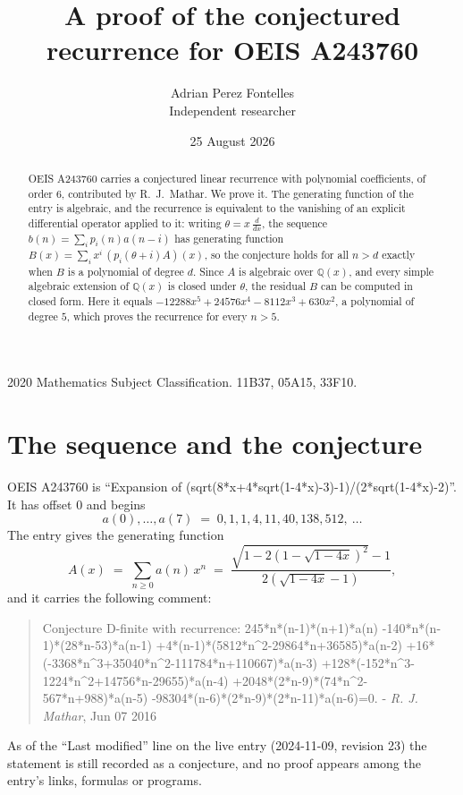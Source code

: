 \documentclass[11pt,a4paper]{article}
\title{A proof of the conjectured recurrence for OEIS A243760}
\author{Adrian Perez Fontelles\\ \small Independent researcher}
\date{25 August 2026}
\theoremstyle{plain}
\theoremstyle{definition}
\begin{document}
\maketitle

\begin{abstract}
OEIS A243760 carries a conjectured linear recurrence with polynomial coefficients, of
order 6, contributed by R.~J.~Mathar. We prove it. The generating function of the
entry is algebraic, and the recurrence is equivalent to the vanishing of an explicit
differential operator applied to it: writing $\theta=x\,\frac{d}{dx}$, the sequence
$b(n)=\sum_{i}p_{i}(n)a(n-i)$ has generating function
$B(x)=\sum_{i}x^{i}\,(p_{i}(\theta+i)A)(x)$, so the conjecture holds for all $n>d$ exactly
when $B$ is a polynomial of degree $d$. Since $A$ is algebraic over $\mathbb{Q}(x)$, and every simple
algebraic extension of $\mathbb{Q}(x)$ is closed under $\theta$, the residual $B$ can be
computed in closed form. Here it equals $- 12288 x^{5} + 24576 x^{4} - 8112 x^{3} + 630 x^{2}$, a polynomial of degree $5$, which proves
the recurrence for every $n>5$.
\end{abstract}

\noindent\small 2020 Mathematics Subject Classification. 11B37, 05A15, 33F10.\normalsize

\section{The sequence and the conjecture}

OEIS A243760 is ``Expansion of (sqrt(8*x+4*sqrt(1-4*x)-3)-1)/(2*sqrt(1-4*x)-2)''. It has offset $0$ and begins
\[
a(0),\dots,a(7)\;=\;0, 1, 1, 4, 11, 40, 138, 512,\ \dots
\]
The entry gives the generating function
\begin{equation}\label{eq:gf}
A(x)\;=\;\sum_{n\ge 0} a(n)\,x^{n}\;=\;\frac{\sqrt{1 - 2 \left(1 - \sqrt{1 - 4 x}\right)^{2}} - 1}{2 \left(\sqrt{1 - 4 x} - 1\right)} ,
\end{equation}
and it carries the following comment:
\begin{quote}\small
Conjecture D-finite with recurrence: 245*n*(n-1)*(n+1)*a(n) -140*n*(n-1)*(28*n-53)*a(n-1) +4*(n-1)*(5812*n\^{}2-29864*n+36585)*a(n-2) +16*(-3368*n\^{}3+35040*n\^{}2-111784*n+110667)*a(n-3) +128*(-152*n\^{}3-1224*n\^{}2+14756*n-29655)*a(n-4) +2048*(2*n-9)*(74*n\^{}2-567*n+988)*a(n-5) -98304*(n-6)*(2*n-9)*(2*n-11)*a(n-6)=0. - \emph{R. J. Mathar}, Jun 07 2016
\end{quote}
As of the ``Last modified'' line on the live entry (2024-11-09, revision 23) the
statement is still recorded as a conjecture, and no proof appears among the entry's links,
formulas or programs.
\end{document}
